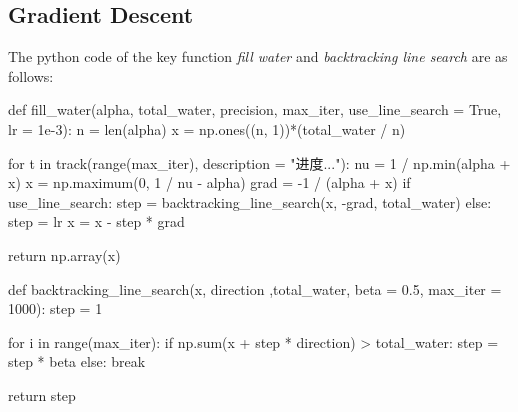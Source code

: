 \documentclass[12pt, a4paper, oneside]{article}
\begin{document}
\subsection{Gradient Descent}
The python code of the key function \textit{fill water} and \textit{backtracking line search} are as follows: 
\begin{python}
def fill_water(alpha, total_water, precision, max_iter, use_line_search = True, lr = 1e-3):
    n = len(alpha)
    x = np.ones((n, 1))*(total_water / n)

    for t in track(range(max_iter), description = "进度..."):
        nu = 1 / np.min(alpha + x)
        x = np.maximum(0, 1 / nu - alpha)
        grad = -1 / (alpha + x)
        if use_line_search:
            step = backtracking_line_search(x, -grad, total_water)
        else:
            step = lr
        x = x - step * grad
        
    return np.array(x)
\end{python}
\begin{python}
def backtracking_line_search(x, direction ,total_water, beta = 0.5, max_iter = 1000):
    step = 1

    for i in range(max_iter):
        if np.sum(x + step * direction) > total_water:
            step = step * beta
        else:
            break
        
    return step
\end{python}
\end{document}
